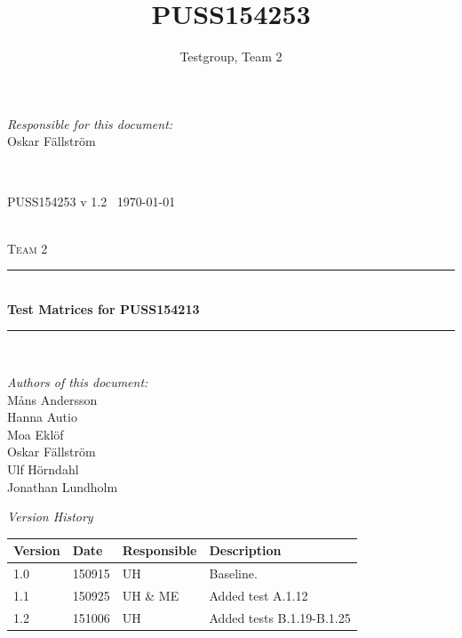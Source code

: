 \documentclass[a4paper]{article}
\title{PUSS154253}
\author{Testgroup, Team 2}
\newcommand{\version}{v 1.2}
\newcommand{\SVVS}{PUSS154213}
\begin{document}
\begin{titlepage}
\newcommand{\HRule}{\rule{\linewidth}{0.5mm}}

\begin{minipage}{0.5\textwidth}
\begin{flushleft} %
\textit{Responsible for this document:}\\
Oskar Fällström %
\end{flushleft}
\end{minipage}
~
\begin{minipage}{0.4\textwidth}
\begin{flushright}
PUSS154253 \version\  %
\today
\end{flushright}
\end{minipage}\\[3cm]

\centering
\textsc{\LARGE Team 2}\\[0.5cm]

\HRule \\[0.4cm]
{ \huge \bfseries Test Matrices for \SVVS\ }\\[0.4cm] %
\HRule \\[1.5cm]

\vfill
\begin{flushleft}
\textit{Authors of this document:}\\
Måns Andersson \\
Hanna Autio \\
Moa Eklöf \\
Oskar Fällström \\
Ulf Hörndahl \\
Jonathan Lundholm
\end{flushleft}


\end{titlepage}

\begin{center}
\textit{\large Version History}

    \begin{tabular}{ | l | l | l | p{5cm} |}
    \hline
    \textbf{Version} 	& \textbf{Date} 	& \textbf{Responsible} 	& \textbf{Description} 		\\ \hline
    1.0				 	& 150915 			& UH 					&  Baseline. 				\\ \hline
    1.1					& 150925			& UH \& ME			&  Added test A.1.12 \\ \hline
    1.2					& 151006			& UH 					& Added tests B.1.19-B.1.25 \\ \hline
    \end{tabular}
\end{center}
\end{document}
